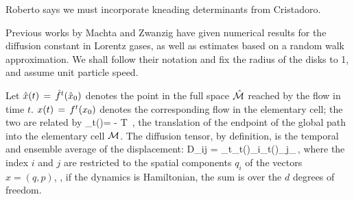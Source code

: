      { Roberto says we must incorporate kneading
    determinants from Cristadoro.
    }



Previous works by Machta and Zwanzig have given numerical
results for the diffusion constant in Lorentz gases,  as well as
estimates based on a random walk approximation. We shall follow their
notation and fix the radius of the disks to 1, and assume unit
particle speed.

Let $\hat x(t)\,=\,{\hat{f}^{t}(\hat x_0)}$ denotes the point in the full 
space $\hat {{\cal M}}$ reached by the flow in time $t$.
$x(t)\,=\,{f^{t}({x_0})}$ denotes the corresponding flow in the
elementary cell; the two are related by
\beq
\hn_t(\xInit)= -  \in T \,,
the translation of the endpoint of the global path into the elementary
cell $\pS$. The diffusion tensor, by definition, is the temporal and
ensemble average of the displacement: 
\beq
D_{ij} =
\lim_{t\to\infty}\left\langle\hn_t(\xInit)_i\hn_t(\xInit)_j\right\rangle_{\hM}\,,
\label{eq-diff-def}
\eeq
where the index $i$ and $j$ are restricted to the spatial components
$q_i$ of the {\statesp} vectors $x=(q,p)$, \ie, if the dynamics is
Hamiltonian, the sum is over the $d$ degrees of freedom. 

